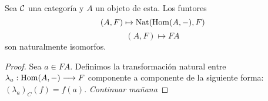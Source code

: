 \begin{theorem}
  Sea $\mathcal{C}$ una categoría y $A$ un objeto de esta. Los funtores
  $$(A, F) \mapsto \operatorname{Nat}(\operatorname{Hom}(A, -), F)$$
  $$(A, F) \mapsto FA$$
  son naturalmente isomorfos.
\end{theorem}
\begin{proof}
  Sea $a \in F A$. Definimos la transformación natural entre
  $\lambda_a : \operatorname{Hom}(A, -)\longrightarrow F$ componente a componente de
  la siguiente forma: $(\lambda_a)_C(f) = f(a)$.
  \textit{Continuar mañana}
\end{proof}
